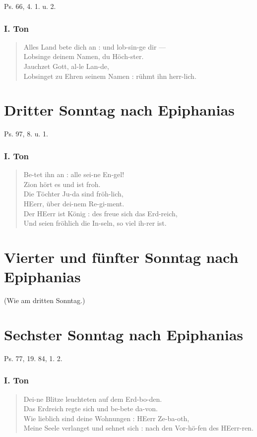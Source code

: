 Ps. 66, 4. 1. u. 2.

\subsubsection{I. Ton}
\begin{verse}
Alles Land bete dich an : und lob-sin-ge dir —\\
Lobsinge deinem Namen, du Höch-ster.\\
Jauchzet Gott, al-le Lan-de,\\
Lobsinget zu Ehren seinem Namen : rühmt ihn herr-lich.
\end{verse}

\section{Dritter Sonntag nach Epiphanias}

Ps. 97, 8. u. 1.

\subsubsection{I. Ton}
\begin{verse}
Be-tet ihn an : alle sei-ne En-gel!\\
Zion hört es und ist froh.\\
Die Töchter Ju-da sind fröh-lich,\\
HEerr, über dei-nem Re-gi-ment.\\
Der HEerr ist König : des freue sich das Erd-reich,\\
Und seien fröhlich die In-seln, so viel ih-rer ist.
\end{verse}

\section[Vierter und fünfter Sonntag]{Vierter und fünfter Sonntag nach Epiphanias}

(Wie am dritten Sonntag.)

\section{Sechster Sonntag nach Epiphanias}

Ps. 77, 19. 84, 1. 2.

\subsubsection{I. Ton}
\begin{verse}
Dei-ne Blitze leuchteten auf dem Erd-bo-den.\\
Das Erdreich regte sich und be-bete da-von.\\
Wie lieblich sind deine Wohnungen : HEerr Ze-ba-oth,\\
Meine Seele verlanget und sehnet sich : nach den Vor-hö-fen des HEerr-ren.
\end{verse}

